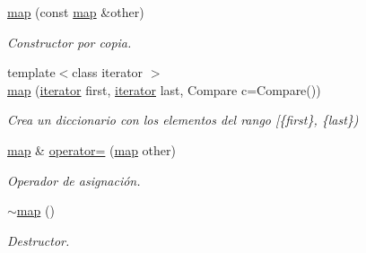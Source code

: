 \begin{Indent}
\begin{DoxyCompactItemize}
\hyperlink{classaed2_1_1map_a7a77950a3d8e637bfa7cf5dcd904f257}{map} (const \hyperlink{classaed2_1_1map}{map} \&other)
\begin{DoxyCompactList}\small\item\em Constructor por copia. \end{DoxyCompactList}\item 
{\footnotesize template$<$class iterator $>$ }\\\hyperlink{classaed2_1_1map_a5d336f3248572beb56be383dcc95cfeb}{map} (\hyperlink{classaed2_1_1map_1_1iterator}{iterator} first, \hyperlink{classaed2_1_1map_1_1iterator}{iterator} last, Compare c=Compare())
\begin{DoxyCompactList}\small\item\em Crea un diccionario con los elementos del rango \mbox{[}\{first\}, \{last\}) \end{DoxyCompactList}\item 
\hyperlink{classaed2_1_1map}{map} \& \hyperlink{classaed2_1_1map_ac606d334809066929522964d45e76317}{operator=} (\hyperlink{classaed2_1_1map}{map} other)
\begin{DoxyCompactList}\small\item\em Operador de asignación. \end{DoxyCompactList}\item 
\hyperlink{classaed2_1_1map_ab22c9a85c2dadbc286cd30e97069a8e6}{$\sim$map} ()
\begin{DoxyCompactList}\small\item\em Destructor. \end{DoxyCompactList}\end{DoxyCompactItemize}
\end{Indent}
